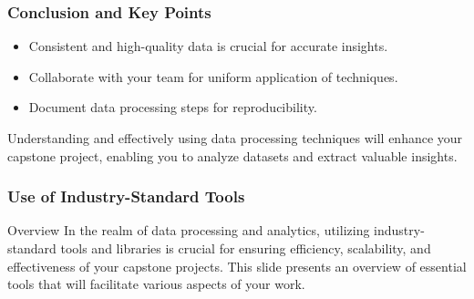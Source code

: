 \documentclass[aspectratio=169]{beamer}
\begin{document}
\begin{frame}
    \frametitle{Conclusion and Key Points}
    \begin{itemize}
        \item Consistent and high-quality data is crucial for accurate insights.
        \item Collaborate with your team for uniform application of techniques.
        \item Document data processing steps for reproducibility.
    \end{itemize}
    Understanding and effectively using data processing techniques will enhance your capstone project, enabling you to analyze datasets and extract valuable insights. 
\end{frame}

\begin{frame}
    \frametitle{Use of Industry-Standard Tools}
    \begin{block}{Overview}
        In the realm of data processing and analytics, utilizing industry-standard tools and libraries is crucial for ensuring efficiency, scalability, and effectiveness of your capstone projects. This slide presents an overview of essential tools that will facilitate various aspects of your work.
    \end{block}
\end{frame}
\end{document}
